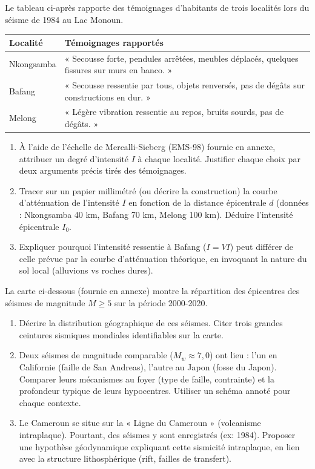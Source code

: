 \documentclass[11pt]{article}
\begin{document}
\begin{exercice}
Le tableau ci-après rapporte des témoignages d'habitants de trois localités lors du séisme de 1984 au Lac Monoun.

\begin{center}
\begin{tabular}{|p{2.5cm}|p{11cm}|}
\hline
Localité & Témoignages rapportés \\
\hline
Nkongsamba & « Secousse forte, pendules arrêtées, meubles déplacés, quelques fissures sur murs en banco. » \\
\hline
Bafang & « Secousse ressentie par tous, objets renversés, pas de dégâts sur constructions en dur. » \\
\hline
Melong & « Légère vibration ressentie au repos, bruits sourds, pas de dégâts. » \\
\hline
\end{tabular}
\end{center}

\begin{enumerate}
\item À l'aide de l'échelle de Mercalli-Sieberg (EMS-98) fournie en annexe, attribuer un degré d'intensité $I$ à chaque localité. Justifier chaque choix par deux arguments précis tirés des témoignages.
\item Tracer sur un papier millimétré (ou décrire la construction) la courbe d'atténuation de l'intensité $I$ en fonction de la distance épicentrale $d$ (données : Nkongsamba 40 km, Bafang 70 km, Melong 100 km). Déduire l'intensité épicentrale $I_0$.
\item Expliquer pourquoi l'intensité ressentie à Bafang ($I=VI$) peut différer de celle prévue par la courbe d'atténuation théorique, en invoquant la nature du sol local (alluvions vs roches dures).
\end{enumerate}
\end{exercice}

\begin{exercice}
La carte ci-dessous (fournie en annexe) montre la répartition des épicentres des séismes de magnitude $M \ge 5$ sur la période 2000-2020.

\begin{enumerate}
\item Décrire la distribution géographique de ces séismes. Citer trois grandes ceintures sismiques mondiales identifiables sur la carte.
\item Deux séismes de magnitude comparable ($M_w \approx 7,0$) ont lieu : l'un en Californie (faille de San Andreas), l'autre au Japon (fosse du Japon). Comparer leurs mécanismes au foyer (type de faille, contrainte) et la profondeur typique de leurs hypocentres. Utiliser un schéma annoté pour chaque contexte.
\item Le Cameroun se situe sur la « Ligne du Cameroun » (volcanisme intraplaque). Pourtant, des séismes y sont enregistrés (ex: 1984). Proposer une hypothèse géodynamique expliquant cette sismicité intraplaque, en lien avec la structure lithosphérique (rift, failles de transfert).
\end{enumerate}
\end{exercice}
\end{document}
